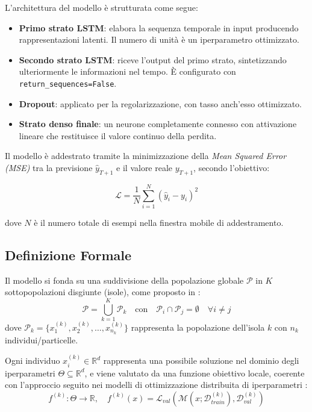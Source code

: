 \documentclass{article}
\begin{document}
L’architettura del modello è strutturata come segue:

\begin{itemize}
    \item \textbf{Primo strato LSTM}: elabora la sequenza temporale in input producendo rappresentazioni latenti. Il numero di unità è un iperparametro ottimizzato.
    \item \textbf{Secondo strato LSTM}: riceve l'output del primo strato, sintetizzando ulteriormente le informazioni nel tempo. È configurato con \verb|return_sequences=False|.
    \item \textbf{Dropout}: applicato per la regolarizzazione, con tasso anch'esso ottimizzato.
    \item \textbf{Strato denso finale}: un neurone completamente connesso con attivazione lineare che restituisce il valore continuo della perdita.
\end{itemize}

Il modello è addestrato tramite la minimizzazione della \textit{Mean Squared Error (MSE)} tra la 
previsione $\hat{y}_{T+1}$ e il valore reale $y_{T+1}$, secondo l’obiettivo:

\begin{equation}
\mathcal{L} = \frac{1}{N} \sum_{i=1}^N \left( \hat{y}_{i} - y_{i} \right)^2
\end{equation}

dove $N$ è il numero totale di esempi nella finestra mobile di addestramento.

\subsection{Definizione Formale}

Il modello si fonda su una suddivisione della popolazione globale $\mathcal{P}$ in $K$ sottopopolazioni 
disgiunte (isole), come proposto in \cite{alba2002parallelism, tomassini2005spatially}:
\begin{equation}
\mathcal{P} = \bigcup_{k=1}^K \mathcal{P}_k \quad \text{con} \quad \mathcal{P}_i \cap \mathcal{P}_j = \emptyset \quad \forall i \neq j
\end{equation}
dove $\mathcal{P}_k = \{x_1^{(k)}, x_2^{(k)}, \dots, x_{n_k}^{(k)}\}$ rappresenta la popolazione dell'isola $k$ con $n_k$ individui/particelle.

Ogni individuo $x_i^{(k)} \in \mathbb{R}^d$ rappresenta una possibile soluzione nel dominio degli 
iperparametri $\Theta \subseteq \mathbb{R}^d$, e viene valutato da una funzione obiettivo locale, 
coerente con l'approccio seguito nei modelli di ottimizzazione distribuita di iperparametri \cite{li2019openbox}:
\begin{equation}
f^{(k)} : \Theta \to \mathbb{R}, \quad f^{(k)}(x) = \mathcal{L}_{val}(\mathcal{M}(x; \mathcal{D}_{train}^{(k)}), \mathcal{D}_{val}^{(k)})
\end{equation}
\end{document}
